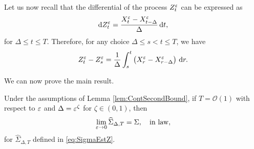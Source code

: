 \documentclass[10pt]{article}
\begin{document}
Let us now recall that the differential of the process $Z^\varepsilon_t$ can be expressed as
\begin{equation}
	\mathrm{d} Z^\varepsilon_t = \frac{X^\varepsilon_t - X^\varepsilon_{t-\Delta}}{\Delta} \,\mathrm{d} t,
\end{equation}
for $\Delta \leq t \leq T$. Therefore, for any choice $\Delta \leq s < t \leq T$, we have
\begin{equation}\label{eq:ContDiffDecomp2}
	Z^\varepsilon_t - Z^\varepsilon_s = \frac1\Delta \int_s^t \left(X^\varepsilon_r - X^\varepsilon_{r-\Delta}\right)\,\mathrm{d} r.
\end{equation}

We can now prove the main result.

\begin{theorem} Under the assumptions of Lemma \ref{lem:ContSecondBound}, if $T = \mathcal O(1)$ with respect to $\varepsilon$ and $\Delta = \varepsilon^\zeta$ for $\zeta \in (0, 1)$, then 
	\begin{equation}
		\lim_{\varepsilon \to 0} \widehat \Sigma_{\Delta, T} = \Sigma, \quad \text{in law},
	\end{equation}
	for $\widehat \Sigma_{\Delta, T}$ defined in \eqref{eq:SigmaEstZ}.
\end{theorem}
\end{document}
